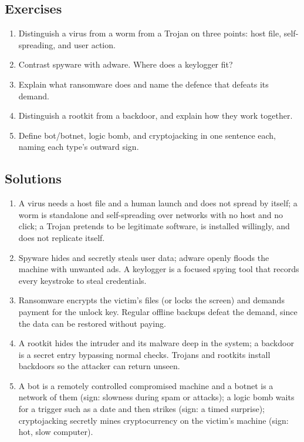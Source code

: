 \subsection*{Exercises}
\begin{enumerate}[label=\arabic*.]
  \item Distinguish a virus from a worm from a Trojan on three points: host
    file, self-spreading, and user action.
  \item Contrast spyware with adware. Where does a keylogger fit?
  \item Explain what ransomware does and name the defence that defeats its
    demand.
  \item Distinguish a rootkit from a backdoor, and explain how they work
    together.
  \item Define bot/botnet, logic bomb, and cryptojacking in one sentence
    each, naming each type's outward sign.
\end{enumerate}

\subsection*{Solutions}
\begingroup\small
\begin{enumerate}[label=\arabic*.]
  \item A virus needs a host file and a human launch and does not spread by
    itself; a worm is standalone and self-spreading over networks with no
    host and no click; a Trojan pretends to be legitimate software, is
    installed willingly, and does not replicate itself.
  \item Spyware hides and secretly steals user data; adware openly floods
    the machine with unwanted ads. A keylogger is a focused spying tool that
    records every keystroke to steal credentials.
  \item Ransomware encrypts the victim's files (or locks the screen) and
    demands payment for the unlock key. Regular offline backups defeat the
    demand, since the data can be restored without paying.
  \item A rootkit hides the intruder and its malware deep in the system; a
    backdoor is a secret entry bypassing normal checks. Trojans and rootkits
    install backdoors so the attacker can return unseen.
  \item A bot is a remotely controlled compromised machine and a botnet is a
    network of them (sign: slowness during spam or attacks); a logic bomb
    waits for a trigger such as a date and then strikes (sign: a timed
    surprise); cryptojacking secretly mines cryptocurrency on the victim's
    machine (sign: hot, slow computer).
\end{enumerate}
\endgroup

